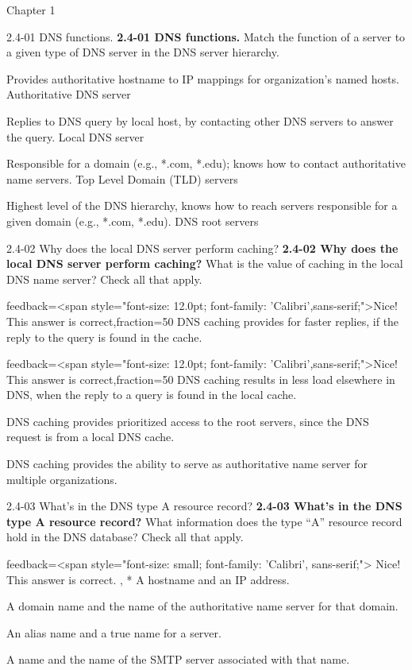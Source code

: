 \documentclass[a4paper]{article}
\begin{document}
\begin{quiz}{Chapter 1}
\begin{matching}[points=1,shuffle]{2.4-01 DNS functions.}
\textbf{2.4-01 DNS functions.} Match the function of a server to a given type of DNS server in the  DNS server hierarchy.
\item Provides authoritative hostname to IP mappings for organization’s named hosts. \answer Authoritative DNS server
\item Replies to DNS query by local host, by contacting other DNS servers to answer the query. \answer Local DNS server
\item Responsible for a domain (e.g., *.com, *.edu); knows how to contact authoritative name servers. \answer Top Level Domain (TLD) servers
\item Highest level of the DNS hierarchy, knows how to reach servers responsible for a given domain (e.g., *.com, *.edu). \answer DNS root servers
\end{matching}

\begin{multi}[points=1,shuffle,multiple]{2.4-02 Why does the local DNS server perform caching?}
\textbf{2.4-02 Why does the local DNS server perform caching?} What is the value of caching in the local DNS name server? Check all that apply.
\item[feedback={<span style="font-size: 12.0pt; font-family: 'Calibri',sans-serif;">Nice! This answer is correct},fraction=50] DNS caching provides for faster replies, if the reply to the query is found in the cache.
\item[feedback={<span style="font-size: 12.0pt; font-family: 'Calibri',sans-serif;">Nice! This answer is correct},fraction=50] DNS caching results in less load elsewhere in DNS, when the reply to a query is found in the local cache.
\item DNS caching provides prioritized access to the root servers, since the DNS request is from a local DNS cache.
\item DNS caching provides the ability to serve as authoritative name server for multiple organizations.
\end{multi}

\begin{multi}[points=1,shuffle,multiple]{2.4-03 What's in the DNS type A resource record?}
\textbf{2.4-03 What's in the DNS type A resource record?} What information does the type “A” resource record hold in the DNS database? Check all that apply.
\item[feedback={<span style="font-size: small; font-family: 'Calibri', sans-serif;"> Nice! This answer is correct. },]* A hostname and an IP address.
\item A domain name and the name of the authoritative name server for that domain.
\item An alias name and a true name for a server.
\item A name and the name of the SMTP server associated with that name.
\end{multi}


\end{quiz}
\end{document}
